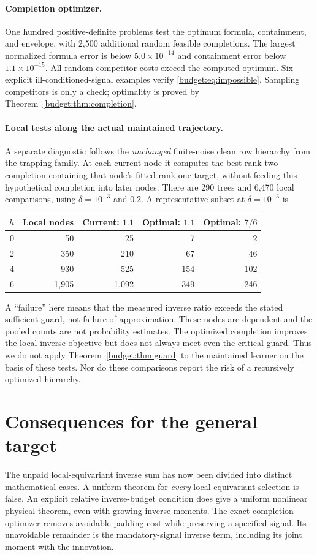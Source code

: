 \documentclass[11pt,oneside,openany,a4paper]{book}
\numberwithin{equation}{chapter}
\theoremstyle{definition}
\theoremstyle{remark}
\begin{document}
\paragraph{Completion optimizer.}
One hundred positive-definite problems test the optimum formula, containment, and envelope, with 2,500 additional random feasible completions. The largest normalized formula error is below $5.0\times10^{-14}$ and containment error below $1.1\times10^{-15}$. All random competitor costs exceed the computed optimum. Six explicit ill-conditioned-signal examples verify \eqref{budget:eq:impossible}. Sampling competitors is only a check; optimality is proved by Theorem~\ref{budget:thm:completion}.

\paragraph{Local tests along the actual maintained trajectory.}
A separate diagnostic follows the \emph{unchanged} finite-noise clean row hierarchy from the trapping family. At each current node it computes the best rank-two completion containing that node's fitted rank-one target, without feeding this hypothetical completion into later nodes. There are 290 trees and 6,470 local comparisons, using $\delta=10^{-3}$ and $0.2$. A representative subset at $\delta=10^{-3}$ is
\begin{center}
\begin{tabular}{rrrrr}
\toprule $h$ & Local nodes & Current: $1.1$ & Optimal: $1.1$ & Optimal: $7/6$\\\midrule
0 & 50 & 25 & 7 & 2\\
2 & 350 & 210 & 67 & 46\\
4 & 930 & 525 & 154 & 102\\
6 & 1,905 & 1,092 & 349 & 246\\\bottomrule
\end{tabular}
\end{center}
A ``failure'' here means that the measured inverse ratio exceeds the stated sufficient guard, not failure of approximation. These nodes are dependent and the pooled counts are not probability estimates. The optimized completion improves the local inverse objective but does not always meet even the critical guard. Thus we do not apply Theorem~\ref{budget:thm:guard} to the maintained learner on the basis of these tests. Nor do these comparisons report the risk of a recursively optimized hierarchy.

\section{Consequences for the general target}
The unpaid local-equivariant inverse sum has now been divided into distinct mathematical cases. A uniform theorem for \emph{every} local-equivariant selection is false. An explicit relative inverse-budget condition does give a uniform nonlinear physical theorem, even with growing inverse moments. The exact completion optimizer removes avoidable padding cost while preserving a specified signal. Its unavoidable remainder is the mandatory-signal inverse term, including its joint moment with the innovation.
\end{document}
